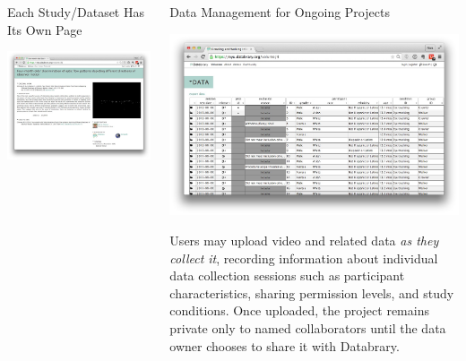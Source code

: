 \documentclass[final]{beamer}
\begin{document}
\begin{frame}{}
\begin{columns}[t]
		\begin{block}{Each Study/Dataset Has Its Own Page}
			\begin{center}
				\includegraphics[width=\textwidth]{img/volume-31.png}
			\end{center}
		\end{block}
		\begin{block}{Data Management for Ongoing Projects}
			\begin{center}
				\includegraphics[width=\textwidth]{img/spreadsheet.png}
			\end{center}
			Users may upload video and related data \emph{as they collect it}, recording information about individual data collection sessions such as participant characteristics, sharing permission levels, and study conditions. Once uploaded, the project remains private only to named collaborators until the data owner chooses to share it with Databrary. 

\end{block}
\end{columns}
\end{frame}
\end{document}
